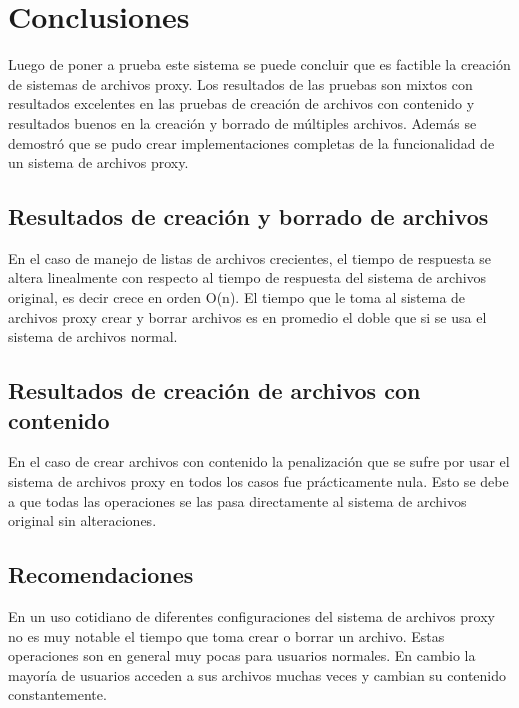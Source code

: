 \def\baselinestretch{1}
\chapter{Conclusiones}
\ifpdf
    \graphicspath{{Conclusions/ConclusionsFigs/PNG/}{Conclusions/ConclusionsFigs/PDF/}{Conclusions/ConclusionsFigs/}}
\else
    \graphicspath{{Conclusions/ConclusionsFigs/EPS/}{Conclusions/ConclusionsFigs/}}
\fi

Luego de poner a prueba este sistema se puede concluir que es factible la creación de sistemas de archivos proxy. Los resultados de las pruebas son mixtos con resultados excelentes en las pruebas de creación de archivos con contenido y resultados buenos en la creación y borrado de múltiples archivos. Además se demostró que se pudo crear implementaciones completas de la funcionalidad de un sistema de archivos proxy.

\section{Resultados de creación y borrado de archivos}

En el caso de manejo de listas de archivos crecientes, el tiempo de respuesta se altera linealmente con respecto al tiempo de respuesta del sistema de archivos original, es decir crece en orden O(n). El tiempo que le toma al sistema de archivos proxy crear y borrar archivos es en promedio el doble que si se usa el sistema de archivos normal.

\section{Resultados de creación de archivos con contenido}

En el caso de crear archivos con contenido la penalización que se sufre por usar el sistema de archivos proxy en todos los casos fue prácticamente nula. Esto se debe a que todas las operaciones se las pasa directamente al sistema de archivos original sin alteraciones.

\section{Recomendaciones}

En un uso cotidiano de diferentes configuraciones del sistema de archivos proxy no es muy notable el tiempo que toma crear o borrar un archivo. Estas operaciones son en general muy pocas para usuarios normales. En cambio la mayoría de usuarios acceden a sus archivos muchas veces y cambian su contenido constantemente. 

